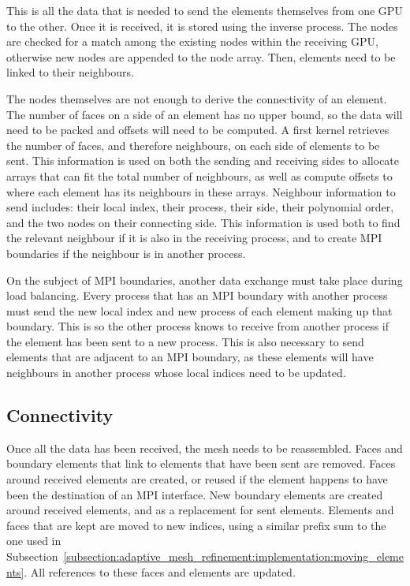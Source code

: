 This is all the data that is needed to send the elements themselves from one GPU to the other. Once
it is received, it is stored using the inverse process. The nodes are checked for a match among the
existing nodes within the receiving GPU, otherwise new nodes are appended to the node array. Then,
elements need to be linked to their neighbours. 

The nodes themselves are not enough to derive the connectivity of an element. The number of faces on
a side of an element has no upper bound, so the data will need to be packed and offsets will need to
be computed. A first kernel retrieves the number of faces, and therefore neighbours, on each side of
elements to be sent. This information is used on both the sending and receiving sides to allocate
arrays that can fit the total number of neighbours, as well as compute offsets to where each element
has its neighbours in these arrays. Neighbour information to send includes: their local index, their
process, their side, their polynomial order, and the two nodes on their connecting side. This
information is used both to find the relevant neighbour if it is also in the receiving process, and
to create MPI boundaries if the neighbour is in another process.

On the subject of MPI boundaries, another data exchange must take place during load balancing. Every
process that has an MPI boundary with another process must send the new local index and new process
of each element making up that boundary. This is so the other process knows to receive from another
process if the element has been sent to a new process. This is also necessary to send elements that
are adjacent to an MPI boundary, as these elements will have neighbours in another process whose
local indices need to be updated.

\subsection{Connectivity} \label{subsection:load_balancing:reconstruction:connectivity}

Once all the data has been received, the mesh needs to be reassembled. Faces and boundary elements
that link to elements that have been sent are removed. Faces around received elements are created,
or reused if the element happens to have been the destination of an MPI interface. New boundary
elements are created around received elements, and as a replacement for sent elements. Elements and
faces that are kept are moved to new indices, using a similar prefix sum to the one used in
Subsection~\ref{subsection:adaptive_mesh_refinement:implementation:moving_elements}. All references
to these faces and elements are updated.

